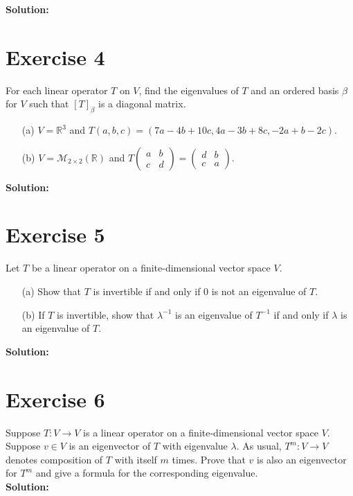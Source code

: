 \documentclass{article}
\begin{document}
\textbf{Solution:} \\



\newpage

\section*{Exercise 4}
For each linear operator $T$ on $V$, find the eigenvalues of $T$ and an ordered basis $\beta$ for $V$ such that $[T]_\beta$ is a diagonal matrix.

\begin{enumerate}
    \item[(a)] $V = \mathbb{R}^3$ and $T(a,b,c) = (7a - 4b + 10c, 4a - 3b + 8c, -2a + b - 2c)$.

    \item[(b)] $V = \mathcal{M}_{2\times 2}(\mathbb{R})$ and $T\begin{pmatrix} a & b \\ c & d \end{pmatrix} = \begin{pmatrix} d & b \\ c & a \end{pmatrix}$.
\end{enumerate}

\textbf{Solution:} \\



\newpage

\section*{Exercise 5}
Let $T$ be a linear operator on a finite-dimensional vector space $V$.

\begin{enumerate}
    \item[(a)] Show that $T$ is invertible if and only if $0$ is not an eigenvalue of $T$.

    \item[(b)] If $T$ is invertible, show that $\lambda^{-1}$ is an eigenvalue of $T^{-1}$ if and only if $\lambda$ is an eigenvalue of $T$.
\end{enumerate}

\textbf{Solution:} \\



\newpage

\section*{Exercise 6}
Suppose $T : V \rightarrow V$ is a linear operator on a finite-dimensional vector space $V$. Suppose $v \in V$ is an eigenvector of $T$ with eigenvalue $\lambda$. As usual, $T^m : V \rightarrow V$ denotes composition of $T$ with itself $m$ times. Prove that $v$ is also an eigenvector for $T^m$ and give a formula for the corresponding eigenvalue. \\

\textbf{Solution:} \\



\newpage
\end{document}
